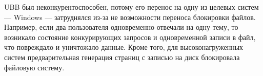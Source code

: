 UBB был неконкурентоспособен, потому его перенос на одну из целевых систем --- Windows --- затруднялся из-за не возможности переноса блокировки файлов. Например, если два пользователя одновременно отвечали на одну тему, то возникало состояние конкурирующих запросов и одновременной записи в файл, что повреждало и уничтожало данные. Кроме того, для высоконагруженных систем предварительная генерация страниц  с записью на диск блокировала файловую систему.







\clearpage